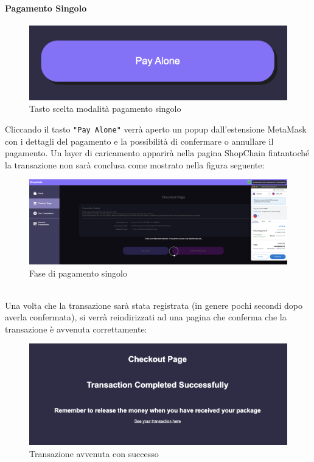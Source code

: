             \paragraph{Pagamento Singolo}
            \begin{figure}[H]
                \centering
                \includegraphics[scale=0.3]{immagini/Checkout/PayAlone.png}
                \caption{Tasto scelta modalità pagamento singolo}
            \end{figure}
            Cliccando il tasto \texttt{"Pay Alone"} verrà aperto un popup dall'estensione MetaMask con i dettagli del pagamento e la possibilità di confermare o annullare il pagamento. Un layer di caricamento apparirà nella pagina ShopChain fintantoché la transazione non sarà conclusa come mostrato nella figura seguente:
            \begin{figure}[H]
                \centering
                \includegraphics[scale=0.2]{immagini/Checkout/SinglePaymentLayer.png}
                \caption{Fase di pagamento singolo}
            \end{figure}
            \textbf{}\\
            Una volta che la transazione sarà stata registrata (in genere pochi secondi dopo averla confermata), si verrà reindirizzati ad una pagina che conferma che la transazione è avvenuta correttamente:
            \begin{figure}[H]
                \centering
                \includegraphics[scale=0.3]{immagini/Checkout/PayAloneTransactionSuccess.png}
                \caption{Transazione avvenuta con successo}
            \end{figure}
